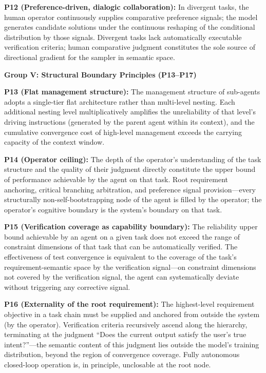 \documentclass[11pt,a4paper]{article}
\theoremstyle{definition}
\begin{document}
\textbf{P12 (Preference-driven, dialogic collaboration):} In divergent tasks, the human operator continuously supplies comparative preference signals; the model generates candidate solutions under the continuous reshaping of the conditional distribution by those signals. Divergent tasks lack automatically executable verification criteria; human comparative judgment constitutes the sole source of directional gradient for the sampler in semantic space.

\medskip
\textbf{Group V: Structural Boundary Principles (P13--P17)}

\textbf{P13 (Flat management structure):} The management structure of sub-agents adopts a single-tier flat architecture rather than multi-level nesting. Each additional nesting level multiplicatively amplifies the unreliability of that level's driving instructions (generated by the parent agent within its context), and the cumulative convergence cost of high-level management exceeds the carrying capacity of the context window.

\textbf{P14 (Operator ceiling):} The depth of the operator's understanding of the task structure and the quality of their judgment directly constitute the upper bound of performance achievable by the agent on that task. Root requirement anchoring, critical branching arbitration, and preference signal provision---every structurally non-self-bootstrapping node of the agent is filled by the operator; the operator's cognitive boundary is the system's boundary on that task.

\textbf{P15 (Verification coverage as capability boundary):} The reliability upper bound achievable by an agent on a given task does not exceed the range of constraint dimensions of that task that can be automatically verified. The effectiveness of test convergence is equivalent to the coverage of the task's requirement-semantic space by the verification signal---on constraint dimensions not covered by the verification signal, the agent can systematically deviate without triggering any corrective signal.

\textbf{P16 (Externality of the root requirement):} The highest-level requirement objective in a task chain must be supplied and anchored from outside the system (by the operator). Verification criteria recursively ascend along the hierarchy, terminating at the judgment ``Does the current output satisfy the user's true intent?''---the semantic content of this judgment lies outside the model's training distribution, beyond the region of convergence coverage. Fully autonomous closed-loop operation is, in principle, unclosable at the root node.
\end{document}
